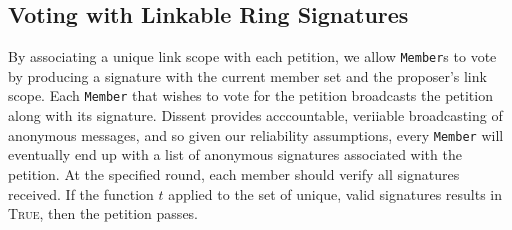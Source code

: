 
\subsection{Voting with Linkable Ring Signatures}
By associating a unique link scope with each petition, we allow \texttt{Member}s
to vote by producing a signature with the current member set and the proposer's
link scope. Each \texttt{Member} that wishes to vote for the petition broadcasts
the petition along with its signature. Dissent provides acccountable, veriiable
broadcasting of anonymous messages, and so given our reliability assumptions,
every \texttt{Member} will eventually end up with a list of anonymous signatures
associated with the petition. At the specified round, each member should verify
all signatures received. If the function $t$ applied to the set of unique, valid
signatures results in \textsc{True}, then the petition passes.

